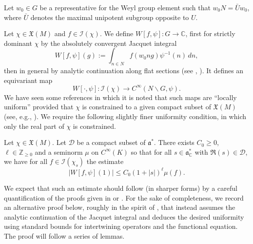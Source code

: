 Let $w_0 \in G$ be a representative for the Weyl group element such that $w_0 N = \bar{U} w_0$, where $\bar{U}$ denotes the maximal unipotent subgroup opposite to $U$.

Let $\chi \in \mathfrak{X}(M)$ and $f \in \mathcal{I}(\chi)$.  We define $W[f,\psi] : G \rightarrow \mathbb{C}$, first for strictly dominant $\chi$ by the absolutely convergent Jacquet integral
\begin{equation}\label{eq:wf-psig-:whittaker-analytic}
  W[f,\psi](g) := \int_{n \in N } f (w_0 n g) \psi^{-1}(n) \, d n,
\end{equation}
then in general by analytic continuation along flat sections (see \cite{MR563369}, \cite[\S15.4]{MR1170566}).  It defines an equivariant map
\begin{equation*}
  W[\cdot, \psi] : \mathcal{I}(\chi) \rightarrow C^\infty(N \backslash G, \psi).
\end{equation*}
We have seen some references in which it is noted that such maps are ``locally uniform'' provided that $\chi$ is constrained to a given compact subset of $\mathfrak{X}(M)$  (see, e.g., \cite[\S3.5]{MR2533003}).  We require the following slightly finer uniformity condition, in which only the real part of $\chi$ is constrained.
\begin{proposition}\label{prop:jacquet-integral-uniformity-question:let-eta-be}
  Let $\chi \in \mathfrak{X}(M)$.  Let $\mathcal{D}$ be a compact subset of $\mathfrak{a}^*$.  There exists $C_0 \geq 0$, $\ell \in \mathbb{Z}_{\geq 0}$ and a seminorm $\mu$ on $C^\infty(K)$ so that for all $s \in \mathfrak{a}_{\mathbb{C}}^*$ with $\Re(s) \in \mathcal{D}$, we have for all $f \in \mathcal{I}(\chi_s)$ the estimate
  \begin{equation*}
    |W[f,\psi](1)|
    \leq
    C_0
    (1 + |s|)^{\ell}
    \mu(f).
  \end{equation*}
\end{proposition}
We expect that such an estimate should follow (in sharper forms) by a careful quantification of the proofs given in \cite{MR563369} or \cite[\S15.4]{MR1170566}.  For the sake of completeness, we record an alternative proof below, roughly in the spirit of \cite[Proof of Lemma 5.6]{MR1800349}, that instead assumes the analytic continuation of the Jacquet integral and deduces the desired uniformity using standard bounds for intertwining operators and the functional equation.  The proof will follow a series of lemmas.

